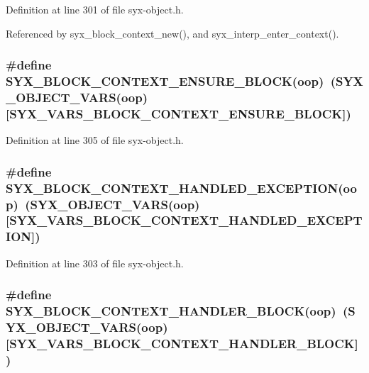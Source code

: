 Definition at line 301 of file syx-object.h.

Referenced by syx\_\-block\_\-context\_\-new(), and syx\_\-interp\_\-enter\_\-context().\hypertarget{syx-object_8h_3616e0a78f2864fb41d8fb1763351d61}{
\subsubsection{\setlength{\rightskip}{0pt plus 5cm}\#define SYX\_\-BLOCK\_\-CONTEXT\_\-ENSURE\_\-BLOCK(oop)~(SYX\_\-OBJECT\_\-VARS(oop)\mbox{[}SYX\_\-VARS\_\-BLOCK\_\-CONTEXT\_\-ENSURE\_\-BLOCK\mbox{]})}}
\label{syx-object_8h_3616e0a78f2864fb41d8fb1763351d61}




Definition at line 305 of file syx-object.h.\hypertarget{syx-object_8h_11ae3cc8275b7b52858768d9756f2604}{
\subsubsection{\setlength{\rightskip}{0pt plus 5cm}\#define SYX\_\-BLOCK\_\-CONTEXT\_\-HANDLED\_\-EXCEPTION(oop)~(SYX\_\-OBJECT\_\-VARS(oop)\mbox{[}SYX\_\-VARS\_\-BLOCK\_\-CONTEXT\_\-HANDLED\_\-EXCEPTION\mbox{]})}}
\label{syx-object_8h_11ae3cc8275b7b52858768d9756f2604}




Definition at line 303 of file syx-object.h.\hypertarget{syx-object_8h_375684bc34c3a90f590eda5b4b3ae62f}{
\subsubsection{\setlength{\rightskip}{0pt plus 5cm}\#define SYX\_\-BLOCK\_\-CONTEXT\_\-HANDLER\_\-BLOCK(oop)~(SYX\_\-OBJECT\_\-VARS(oop)\mbox{[}SYX\_\-VARS\_\-BLOCK\_\-CONTEXT\_\-HANDLER\_\-BLOCK\mbox{]})}}
\label{syx-object_8h_375684bc34c3a90f590eda5b4b3ae62f}




